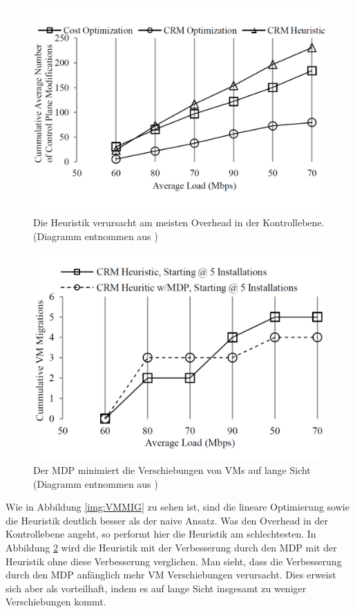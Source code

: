 \documentclass[conference]{IEEEtran}
\begin{document}
\begin{figure}[ht]
	\centering
	\includegraphics[trim=0 3cm 0 1cm,scale=0.25]{grafik/CPM.pdf}
	\caption{Die Heuristik verursacht am meisten Overhead in der Kontrollebene.
	(Diagramm entnommen aus \cite{IEEEhowto:orig})}
	\label{img:CPM}
\end{figure}

\begin{figure}[ht]
	\centering
	\includegraphics[trim=0 2cm 0 1cm,scale=0.25]{grafik/MDP.pdf}
	\caption{Der MDP minimiert die Verschiebungen von VMs auf lange Sicht
	(Diagramm entnommen aus \cite{IEEEhowto:orig})}
	\label{img:MDP}
\end{figure}


Wie in Abbildung \ref{img:VMMIG} zu sehen ist, sind die lineare Optimierung sowie die Heuristik deutlich besser als der naive Ansatz.
Was den Overhead in der Kontrollebene angeht, so performt hier die Heuristik am schlechtesten.
In Abbildung \ref{img:MDP} wird die Heuristik mit der Verbesserung durch den MDP mit der Heuristik ohne diese Verbesserung verglichen. Man sieht, dass die Verbesserung durch den MDP  anfänglich mehr VM Verschiebungen verursacht. Dies erweist sich aber als vorteilhaft, indem es auf lange Sicht insgesamt zu weniger Verschiebungen kommt.
\end{document}
